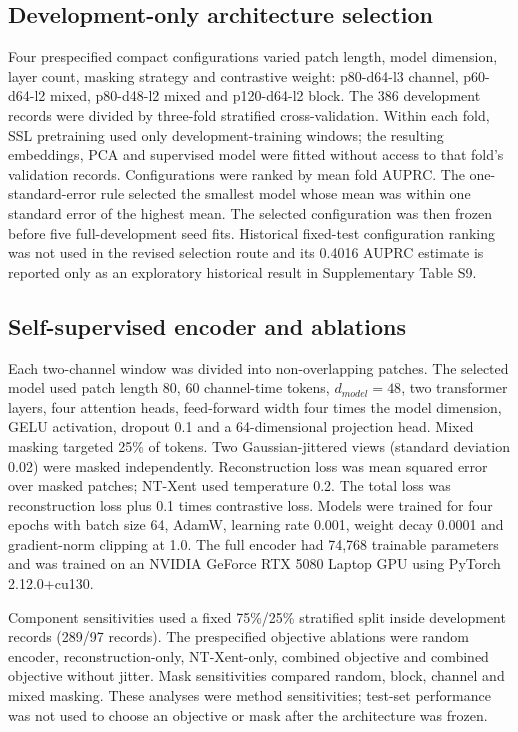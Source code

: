 \documentclass[utf8]{FrontiersinHarvard}
\begin{document}
\subsection{Development-only architecture selection}

Four prespecified compact configurations varied patch length, model dimension, layer count, masking strategy and contrastive weight: p80-d64-l3 channel, p60-d64-l2 mixed, p80-d48-l2 mixed and p120-d64-l2 block. The 386 development records were divided by three-fold stratified cross-validation. Within each fold, SSL pretraining used only development-training windows; the resulting embeddings, PCA and supervised model were fitted without access to that fold's validation records. Configurations were ranked by mean fold AUPRC. The one-standard-error rule selected the smallest model whose mean was within one standard error of the highest mean. The selected configuration was then frozen before five full-development seed fits. Historical fixed-test configuration ranking was not used in the revised selection route and its 0.4016 AUPRC estimate is reported only as an exploratory historical result in Supplementary Table S9.

\subsection{Self-supervised encoder and ablations}

Each two-channel window was divided into non-overlapping patches. The selected model used patch length 80, 60 channel-time tokens, $d_{model}=48$, two transformer layers, four attention heads, feed-forward width four times the model dimension, GELU activation, dropout 0.1 and a 64-dimensional projection head. Mixed masking targeted 25\% of tokens. Two Gaussian-jittered views (standard deviation 0.02) were masked independently. Reconstruction loss was mean squared error over masked patches; NT-Xent used temperature 0.2. The total loss was reconstruction loss plus 0.1 times contrastive loss. Models were trained for four epochs with batch size 64, AdamW, learning rate 0.001, weight decay 0.0001 and gradient-norm clipping at 1.0. The full encoder had 74,768 trainable parameters and was trained on an NVIDIA GeForce RTX 5080 Laptop GPU using PyTorch 2.12.0+cu130.

Component sensitivities used a fixed 75\%/25\% stratified split inside development records (289/97 records). The prespecified objective ablations were random encoder, reconstruction-only, NT-Xent-only, combined objective and combined objective without jitter. Mask sensitivities compared random, block, channel and mixed masking. These analyses were method sensitivities; test-set performance was not used to choose an objective or mask after the architecture was frozen.
\end{document}
